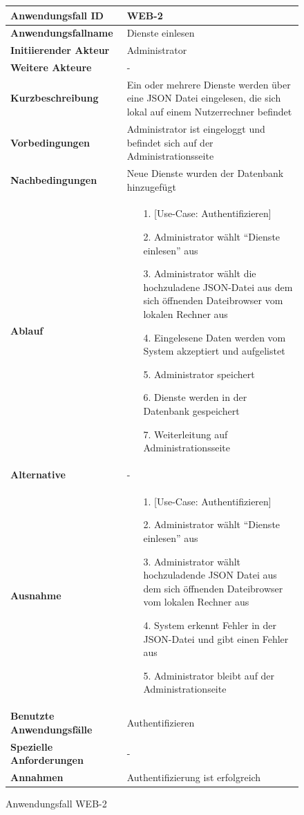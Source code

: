 \begin{figure}[h]
	\centering
	\begin{tabularx}{\textwidth}{ X | X }
		\textbf{Anwendungsfall ID} & WEB-2 \\ \hline
		\textbf{Anwendungsfallname} & Dienste einlesen \\ \hline
		\textbf{Initiierender Akteur} & Administrator \\ \hline
		\textbf{Weitere Akteure} & - \\ \hline
		\textbf{Kurzbeschreibung} & Ein oder mehrere Dienste werden über eine JSON Datei eingelesen, die sich lokal auf einem Nutzerrechner befindet \\ \hline
		\textbf{Vorbedingungen} & Administrator ist eingeloggt und befindet sich auf der Administrationsseite \\ \hline
		\textbf{Nachbedingungen} & Neue Dienste wurden der Datenbank hinzugefügt \\ \hline
		\textbf{Ablauf} &
		\begin{enumerate}
			\item [1.] [Use-Case: Authentifizieren]
			\item [2.] Administrator wählt ``Dienste einlesen'' aus
			\item [3.] Administrator wählt die hochzuladene JSON-Datei aus dem sich öffnenden Dateibrowser vom lokalen Rechner aus
			\item [4.] Eingelesene Daten werden vom System akzeptiert und aufgelistet
			\item [5.] Administrator speichert
			\item [6.] Dienste werden in der Datenbank gespeichert
			\item [7.] Weiterleitung auf Administrationsseite
		\end{enumerate} \\ \hline
		\textbf{Alternative} & - \\ \hline
		\textbf{Ausnahme} &
		\begin{enumerate}
			\item [1.]  [Use-Case: Authentifizieren]
			\item [2.]  Administrator wählt ``Dienste einlesen'' aus
			\item [3.]  Administrator wählt hochzuladende JSON Datei aus dem sich öffnenden Dateibrowser vom lokalen Rechner aus
			\item [4.]  System erkennt Fehler in der JSON-Datei und gibt einen Fehler aus
			\item [5.]  Administrator bleibt auf der Administrationseite
		\end{enumerate}  \\ \hline
		\textbf{Benutzte Anwendungsfälle} & Authentifizieren \\ \hline
		\textbf{Spezielle Anforderungen} & - \\ \hline
		\textbf{Annahmen} & Authentifizierung ist erfolgreich
	\end{tabularx}
	\caption{Anwendungsfall WEB-2}
	\label{fig:anwendungsfall-server-tabelle-web-2}
\end{figure}

